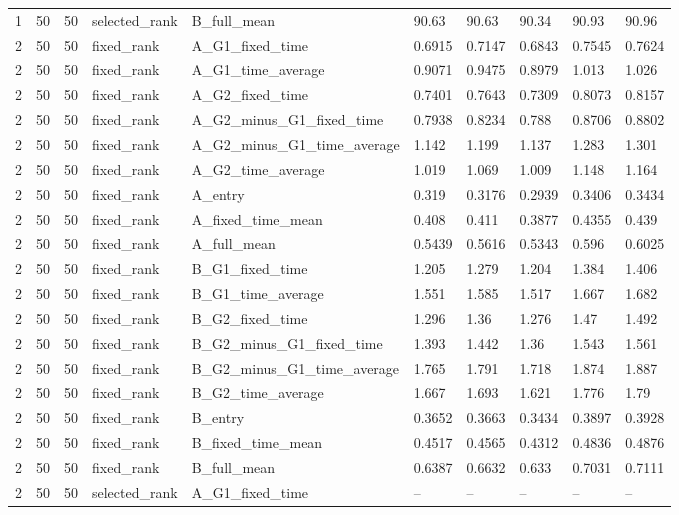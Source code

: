 \begin{longtable}{llllllllll}
1 & 50 & 50 & selected\_rank & B\_full\_mean & 90.63 & 90.63 & 90.34 & 90.93 & 90.96 \\
2 & 50 & 50 & fixed\_rank & A\_G1\_fixed\_time & 0.6915 & 0.7147 & 0.6843 & 0.7545 & 0.7624 \\
2 & 50 & 50 & fixed\_rank & A\_G1\_time\_average & 0.9071 & 0.9475 & 0.8979 & 1.013 & 1.026 \\
2 & 50 & 50 & fixed\_rank & A\_G2\_fixed\_time & 0.7401 & 0.7643 & 0.7309 & 0.8073 & 0.8157 \\
2 & 50 & 50 & fixed\_rank & A\_G2\_minus\_G1\_fixed\_time & 0.7938 & 0.8234 & 0.788 & 0.8706 & 0.8802 \\
2 & 50 & 50 & fixed\_rank & A\_G2\_minus\_G1\_time\_average & 1.142 & 1.199 & 1.137 & 1.283 & 1.301 \\
2 & 50 & 50 & fixed\_rank & A\_G2\_time\_average & 1.019 & 1.069 & 1.009 & 1.148 & 1.164 \\
2 & 50 & 50 & fixed\_rank & A\_entry & 0.319 & 0.3176 & 0.2939 & 0.3406 & 0.3434 \\
2 & 50 & 50 & fixed\_rank & A\_fixed\_time\_mean & 0.408 & 0.411 & 0.3877 & 0.4355 & 0.439 \\
2 & 50 & 50 & fixed\_rank & A\_full\_mean & 0.5439 & 0.5616 & 0.5343 & 0.596 & 0.6025 \\
2 & 50 & 50 & fixed\_rank & B\_G1\_fixed\_time & 1.205 & 1.279 & 1.204 & 1.384 & 1.406 \\
2 & 50 & 50 & fixed\_rank & B\_G1\_time\_average & 1.551 & 1.585 & 1.517 & 1.667 & 1.682 \\
2 & 50 & 50 & fixed\_rank & B\_G2\_fixed\_time & 1.296 & 1.36 & 1.276 & 1.47 & 1.492 \\
2 & 50 & 50 & fixed\_rank & B\_G2\_minus\_G1\_fixed\_time & 1.393 & 1.442 & 1.36 & 1.543 & 1.561 \\
2 & 50 & 50 & fixed\_rank & B\_G2\_minus\_G1\_time\_average & 1.765 & 1.791 & 1.718 & 1.874 & 1.887 \\
2 & 50 & 50 & fixed\_rank & B\_G2\_time\_average & 1.667 & 1.693 & 1.621 & 1.776 & 1.79 \\
2 & 50 & 50 & fixed\_rank & B\_entry & 0.3652 & 0.3663 & 0.3434 & 0.3897 & 0.3928 \\
2 & 50 & 50 & fixed\_rank & B\_fixed\_time\_mean & 0.4517 & 0.4565 & 0.4312 & 0.4836 & 0.4876 \\
2 & 50 & 50 & fixed\_rank & B\_full\_mean & 0.6387 & 0.6632 & 0.633 & 0.7031 & 0.7111 \\
2 & 50 & 50 & selected\_rank & A\_G1\_fixed\_time & -- & -- & -- & -- & -- \\

\end{longtable}
